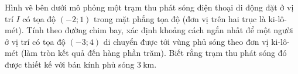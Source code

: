 \begin{ex}%
Hình vẽ bên dưới mô phỏng một trạm thu phát sóng điện thoại di động đặt ở vị trí $I$ có tọa độ $(-2;1)$ trong mặt phẳng tọa độ (đơn vị trên hai trục là ki-lô-mét). Tính theo đường chim bay, xác định khoảng cách ngắn nhất để một người ở vị trí có tọa độ $(-3;4)$ di chuyển được tới vùng phủ sóng theo đơn vị ki-lô-mét (làm tròn kết quả đến hàng phần trăm). Biết rằng trạm thu phát sóng đó được thiết kế với bán kính phủ sóng $3\mathrm{~km}$.
\begin{center}
\end{center}
	\loigiai{
	}
\end{ex}
